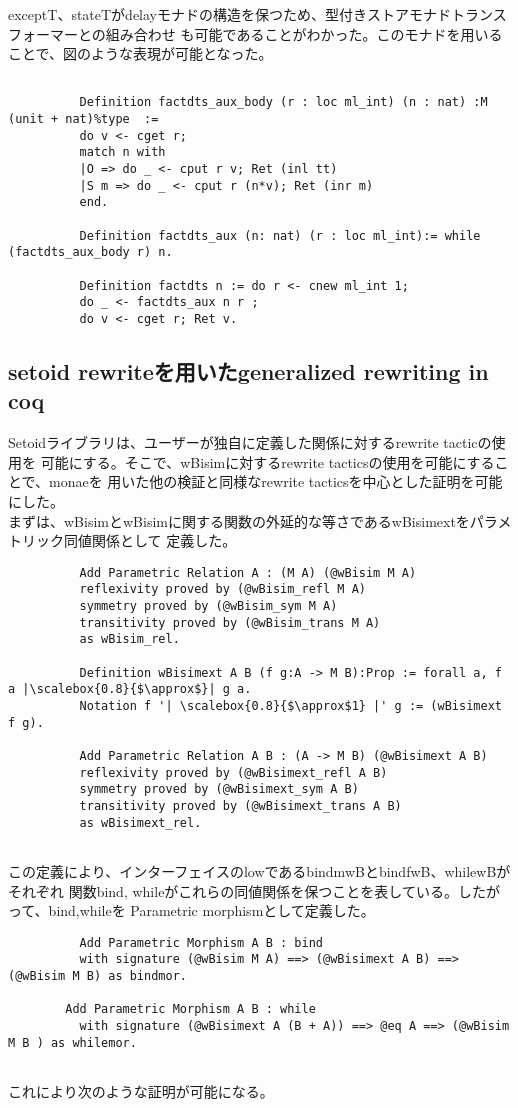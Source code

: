 \documentclass[japanese]{jssst_ppl}
\theoremstyle{definition}
\begin{document}
exceptT、stateTがdelayモナドの構造を保つため、型付きストアモナドトランスフォーマーとの組み合わせ
も可能であることがわかった。このモナドを用いることで、図のような表現が可能となった。

\begin{verbatim}
        
          Definition factdts_aux_body (r : loc ml_int) (n : nat) :M (unit + nat)%type  :=
          do v <- cget r;
          match n with
          |O => do _ <- cput r v; Ret (inl tt)
          |S m => do _ <- cput r (n*v); Ret (inr m)
          end.
        
          Definition factdts_aux (n: nat) (r : loc ml_int):= while (factdts_aux_body r) n.
          
          Definition factdts n := do r <- cnew ml_int 1;
          do _ <- factdts_aux n r ;
          do v <- cget r; Ret v.
            \end{verbatim}
\subsection{setoid rewriteを用いたgeneralized rewriting in coq}
Setoidライブラリは、ユーザーが独自に定義した関係に対するrewrite tacticの使用を
可能にする。そこで、wBisimに対するrewrite tacticsの使用を可能にすることで、monaeを
用いた他の検証と同様なrewrite tacticsを中心とした証明を可能にした。\\

まずは、wBisimとwBisimに関する関数の外延的な等さであるwBisimextをパラメトリック同値関係として
定義した。
\begin{verbatim}
          Add Parametric Relation A : (M A) (@wBisim M A)
          reflexivity proved by (@wBisim_refl M A)
          symmetry proved by (@wBisim_sym M A)
          transitivity proved by (@wBisim_trans M A)
          as wBisim_rel.
        
          Definition wBisimext A B (f g:A -> M B):Prop := forall a, f a |\scalebox{0.8}{$\approx$}| g a.
          Notation f '| \scalebox{0.8}{$\approx$1} |' g := (wBisimext f g).
        
          Add Parametric Relation A B : (A -> M B) (@wBisimext A B)
          reflexivity proved by (@wBisimext_refl A B)
          symmetry proved by (@wBisimext_sym A B)
          transitivity proved by (@wBisimext_trans A B)
          as wBisimext_rel.
        
        \end{verbatim}
この定義により、インターフェイスのlowであるbindmwBとbindfwB、whilewBがそれぞれ
関数bind, whileがこれらの同値関係を保つことを表している。したがって、bind,whileを
Parametric morphismとして定義した。
\begin{verbatim}
          Add Parametric Morphism A B : bind
          with signature (@wBisim M A) ==> (@wBisimext A B) ==> (@wBisim M B) as bindmor.
        
        Add Parametric Morphism A B : while
          with signature (@wBisimext A (B + A)) ==> @eq A ==> (@wBisim M B ) as whilemor.
        
        \end{verbatim}
これにより次のような証明が可能になる。
\end{document}
